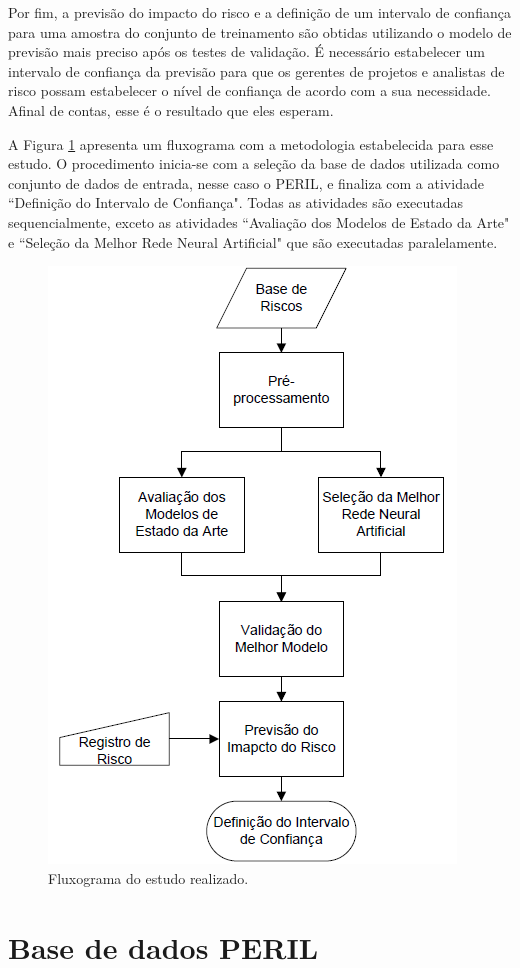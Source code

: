 Por fim, a previsão do impacto do risco e a definição de um intervalo de confiança para uma amostra do conjunto de treinamento são obtidas utilizando o modelo de previsão mais preciso após os testes de validação. É necessário estabelecer um intervalo de confiança da previsão para que os gerentes de projetos e analistas de risco possam estabelecer o nível de confiança de acordo com a sua necessidade. Afinal de contas, esse é o resultado que eles esperam.

A Figura \ref{fig:method} apresenta um fluxograma com a metodologia estabelecida para esse estudo. O procedimento inicia-se com a seleção da base de dados utilizada como conjunto de dados de entrada, nesse caso o PERIL, e finaliza com a atividade ``Definição do Intervalo de Confiança". Todas as atividades são executadas sequencialmente, exceto as atividades ``Avaliação dos Modelos de Estado da Arte" e ``Seleção da Melhor Rede Neural Artificial" que são executadas paralelamente.

\begin{figure}[h]
	\centering
	\includegraphics[width=.45\textwidth]{image/MetodologiaDissertacao.png}
	\caption{Fluxograma do estudo realizado.}
	\label{fig:method}
\end{figure}

\section{Base de dados PERIL}
\label{sec:perildataset}

